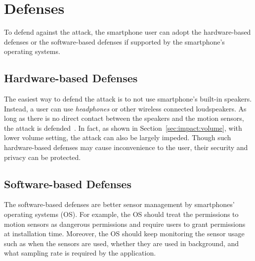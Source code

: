 \section{Defenses}

To defend against the {\attackName} attack, the smartphone user can adopt the hardware-based defenses or the software-based defenses if supported by the smartphone's operating systems.
\subsection{Hardware-based Defenses}
The easiest way to defend the {\attackName} attack is to not use smartphone's built-in speakers. Instead, a user can use \textit{headphones} or other wireless connected loudspeakers. As long as there is no direct contact between the speakers and the motion sensors, the attack is defended~\cite{anand2018speechless}. In fact, as shown in Section~\ref{sec:impact:volume}, with lower volume setting, the {\attackName} attack can also be largely impeded. Though such hardware-based defenses may cause inconvenience to the user, their security and privacy can be protected.
\subsection{Software-based Defenses}
The software-based defenses are better sensor management by smartphones' operating systems (OS). For example, the OS should treat the permissions to motion sensors as dangerous permissions and require users to grant permissions at installation time. Moreover, the OS should keep monitoring the sensor usage such as when the sensors are used, whether they are used in background, and what sampling rate is required by the application. 


